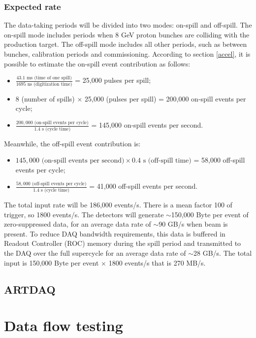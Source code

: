 \subsubsection{Expected rate}
The data-taking periods will be divided into two modes: on-spill and off-spill. The on-spill mode includes periods when 8 GeV 
proton bunches are colliding with the production target. The off-spill mode includes all other periods, such as between bunches, calibration periods and commissioning.
According to section \ref{accel}, it is possible to estimate the on-spill event contribution as follows:
\begin{itemize}
    \item $\frac{43.1 \text{ ms (time of one spill)}}{1695 \text{ ns (digitization time)}}$ = 25,000 pulses per spill;
    \item 8 (number of spills) $\times$ 25,000 (pulses per spill) = 200,000 on-spill events per cycle;
    \item $\frac{200,000 \text{ (on-spill events per cycle)}}{1.4 \text{ s (cycle time)}}$ = 145,000 on-spill events per second.
\end{itemize}
Meanwhile, the off-spill event contribution is:
\begin{itemize}
    \item $145,000 \text{ (on-spill events per second)} \times 0.4 \text{ s (off-spill time)}$ = 58,000 off-spill events per cycle;
    \item $\frac{58,000 \text{ (off-spill events per cycle)}}{1.4 \text{ s (cycle time)}}$ = 41,000 off-spill events per second.
\end{itemize}
The total input rate will be 186,000 events/s. %
There is a mean factor 100 of trigger, so 1800 events/s.
The detectors will generate $\sim$150,000 Byte per event of zero-suppressed data, for an average data rate of $\sim$90 GB/s when beam is present. 
To reduce DAQ bandwidth requirements, this data is buffered in Readout Controller (ROC) memory during the spill period and transmitted to the 
DAQ over the full supercycle for an average data rate of $\sim$28 GB/s.
The total input is 150,000 Byte per event $\times$ 1800 events/s that is 270 MB/s.
\subsection{ARTDAQ}
\section{Data flow testing}
\fi

